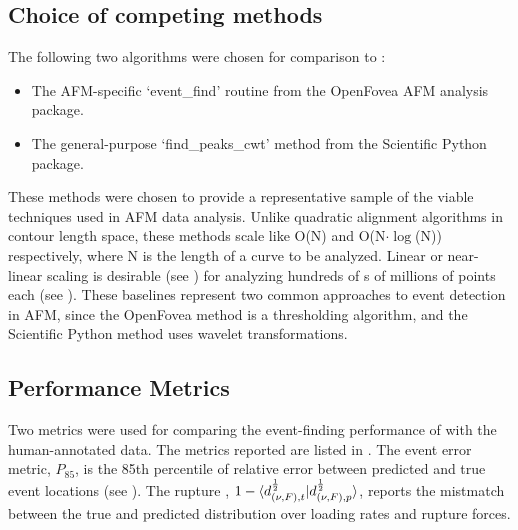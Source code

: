 \subsection{Choice of competing methods}

The following two algorithms were chosen for comparison to \name{}: 

\begin{itemize}
\item The AFM-specific `event\_find' routine from the OpenFovea AFM analysis package.
\item The general-purpose `find\_peaks\_cwt' method from the Scientific Python package.
\end{itemize}

 These methods were chosen to provide a representative sample of the viable techniques used in AFM data analysis. Unlike quadratic alignment algorithms in contour length space, these methods scale like O(N) and O(N$\cdot\log$(N)) respectively, where N is the length of a curve to be analyzed. Linear or near-linear scaling is desirable (see ) for analyzing hundreds of \fec{}s of millions of points each (see ). These baselines represent two common approaches to event detection in AFM, since the OpenFovea method is a thresholding algorithm, and the Scientific Python method uses wavelet transformations. 

\subsection{Performance Metrics}

Two metrics were used for comparing the event-finding performance of \name{} with the human-annotated data. The metrics reported are listed in . The event error metric, $P_{85}$, is the 85th percentile of relative error between predicted and true event locations (see ). The rupture \BccLong{}, $1-\braket{d_{(\nu,F),t}^{\frac{1}{2}}|d_{(\nu,F),p}^{\frac{1}{2}}}$, reports the mistmatch between the true and predicted distribution over loading rates and rupture forces. 


